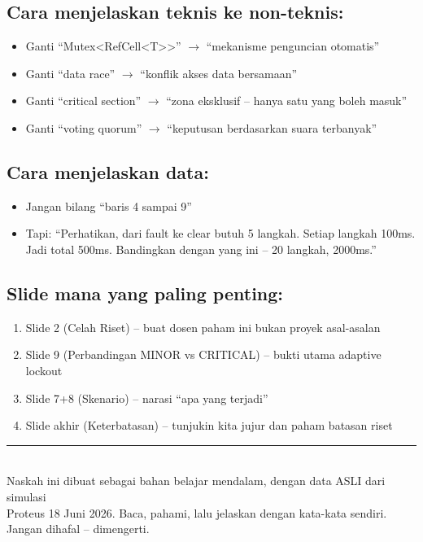 \documentclass[12pt,a4paper]{article}
\begin{document}
\subsection{Cara menjelaskan teknis ke non-teknis:}

\begin{itemize}[nosep]
    \item Ganti ``Mutex<RefCell<T>>'' $\rightarrow$ ``mekanisme penguncian otomatis''
    \item Ganti ``data race'' $\rightarrow$ ``konflik akses data bersamaan''
    \item Ganti ``critical section'' $\rightarrow$ ``zona eksklusif -- hanya satu yang boleh masuk''
    \item Ganti ``voting quorum'' $\rightarrow$ ``keputusan berdasarkan suara terbanyak''
\end{itemize}

\subsection{Cara menjelaskan data:}

\begin{itemize}[nosep]
    \item Jangan bilang ``baris 4 sampai 9''
    \item Tapi: ``Perhatikan, dari fault ke clear butuh 5 langkah. Setiap langkah 100ms.
          Jadi total 500ms. Bandingkan dengan yang ini -- 20 langkah, 2000ms.''
\end{itemize}

\subsection{Slide mana yang paling penting:}

\begin{enumerate}[nosep]
    \item Slide 2 (Celah Riset) -- buat dosen paham ini bukan proyek asal-asalan
    \item Slide 9 (Perbandingan MINOR vs CRITICAL) -- bukti utama adaptive lockout
    \item Slide 7+8 (Skenario) -- narasi ``apa yang terjadi''
    \item Slide akhir (Keterbatasan) -- tunjukin kita jujur dan paham batasan riset
\end{enumerate}

\vspace{1cm}
\begin{center}
\rule{0.5\textwidth}{0.4pt}\\[4pt]
{\small Naskah ini dibuat sebagai bahan belajar mendalam, dengan data ASLI dari simulasi}\\
{\small Proteus 18 Juni 2026. Baca, pahami, lalu jelaskan dengan kata-kata sendiri.}\\
{\small Jangan dihafal -- dimengerti.}
\end{center}
\end{document}
